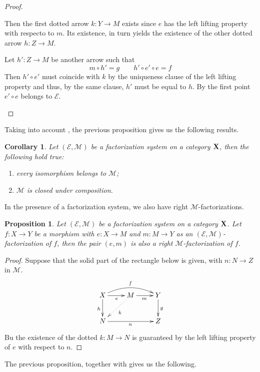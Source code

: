 \documentclass[a4paper]{article}
\def\X{\textbf {\textup{X}}}
\newtheorem{proposition}[theorem]{Proposition}
\newtheorem{corollary}[theorem]{Corollary}
\theoremstyle{definition}
\begin{document}
\begin{proof}
\begin{enumerate}
		Then the first dotted arrow $k\colon Y\to M$ exists since $e$ has the left lifting property with respecto to $m$. Its existence, in turn yields the existence of the other dotted arrow $h\colon Z\to M$. 
	
		 Let $h'\colon Z\to M$ be another arrow such that 
		 \[m\circ h'=g \qquad h'\circ e'\circ e=f\]
		 Then $h'\circ e'$ must coincide with $k$ by the uniqueness clause of the left lifting property and thus, by the same clause, $h'$ must be equal to $h$. By the first point $e'\circ e$ belongs to $\mathcal{E}$. \qedhere 
	\end{enumerate}
\end{proof}

Taking into account , the previous proposition gives us the following results.

\begin{corollary}\label{cor:m}Let $(\mathcal{E}, \mathcal{M})$ be a factorization system on a category $\X$, then the following hold true:
	\begin{enumerate}
		\item every isomorphism belongs to $\mathcal{M}$;
		\item $\mathcal{M}$ is closed under composition.
	\end{enumerate}
\end{corollary}

In the presence of a factorization system, we also have right $\mathcal{M}$-factorizations.

\begin{proposition}\label{prop:rfact}
	Let $(\mathcal{E}, \mathcal{M})$ be a factorization system on a category $\X$. Let $f\colon X\to Y$ be a morphism with $e\colon X\to M$ and $m\colon M\to Y$ as an $(\mathcal{E}, \mathcal{M})$-factorization of $f$, then the pair $(e, m)$ is also a right $\mathcal{M}$-factorization of $f$.
\end{proposition}
\begin{proof}
	Suppose that the solid part of the rectangle below is given, with $n\colon N\to Z$ in $\mathcal{M}$. 
	\[\xymatrix{X \ar[d]_{h} \ar@/^.4cm/[rr]^{f} \ar[r]_{e}& M \ar@{.>}[dl]^{k} \ar[r]_{m} & Y \ar[d]^{g}\\N \ar[rr]_{n}&& Z}\]
	Bu the existence of the dotted $k\colon M\to N$ is guaranteed by the left lifting property of $e$ with respect to $n$.
\end{proof}

The previous proposition, together with  gives us the following.
\end{document}
